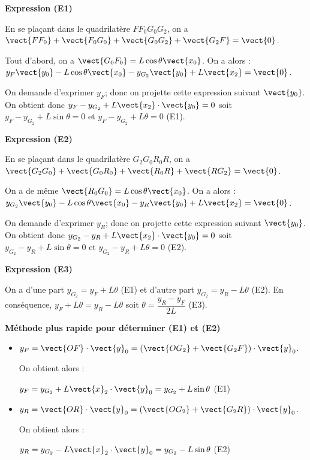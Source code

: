 \documentclass[11pt]{article}
\begin{document}
\begin{UPSTIcorrige}

\textbf{Expression (E1)}

En se plaçant dans le quadrilatère $F F_0 G_0 G_2$, on a $\vect{F F_0} + \vect{F_0 G_0}+\vect{G_0 G_2}+\vect{G_2 F}=\vect{0}$. 

Tout d'abord, on a $\vect{G_0 F_0} = L\cos \theta \vect{x_0}$. On a alors : $y_F \vect{y_0} - L\cos \theta \vect{x_0} - y_{G_2} \vect{y_0} + L\vect{x_2}=\vect{0}$.  

On demande d'exprimer $y_F$; donc on projette cette expression suivant  $\vect{y_0}$. On obtient donc 
$y_F - y_{G_2}  + L\vect{x_2}\cdot \vect{y_0}=0$ soit $y_F - y_{G_2}  + L\sin \theta=0$ et   $y_F - y_{G_2}  + L \theta=0$  (E1).

\textbf{Expression (E2)}

En se plaçant dans le quadrilatère $G_2 G_0 R_0 R$, on a $\vect{G_2 G_0} + \vect{ G_0 R_0}+\vect{R_0 R}+\vect{R G_2 }=\vect{0}$. 

On a de même $\vect{R_0 G_0} = L\cos \theta \vect{x_0}$. On a alors : $y_{G_2} \vect{y_0} - L\cos \theta \vect{x_0} - y_{R} \vect{y_0} + L\vect{x_2}=\vect{0}$.  

On demande d'exprimer $y_R$; donc on projette cette expression suivant  $\vect{y_0}$. On obtient donc 
$y_{G_2}  - y_{R}  + L\vect{x_2}\cdot \vect{y_0}=0$ soit $y_{G_2}  - y_{R}  + L\sin \theta=0$ et $y_{G_2}  - y_{R}  + L \theta=0$ (E2).


\textbf{Expression (E3)}

On a d'une part $y_{G_2} = y_F  + L \theta$  (E1) et d'autre part $y_{G_2}  = y_{R}  - L \theta$ (E2).
En conséquence,  $y_F  + L \theta =  y_{R}  - L \theta$  soit $  \theta = \dfrac{ y_{R} - y_F}{2L } $ (E3).

\textbf{Méthode plus rapide pour déterminer (E1) et (E2)}

\begin{itemize}
\item $y_F=\vect{OF}\cdot \vect{y}_0=\left(\vect{OG_2}+\vect{G_2F}\right)\cdot \vect{y}_0$.

On obtient alors : 

$y_F=y_{G_2}+L\vect{x}_2\cdot \vect{y}_0=y_{G_2}+L\sin\theta$ (E1)

\item $y_R=\vect{OR}\cdot \vect{y}_0=\left(\vect{OG_2}+\vect{G_2R}\right)\cdot \vect{y}_0$.

On obtient alors : 

$y_R=y_{G_2}-L\vect{x}_2\cdot \vect{y}_0=y_{G_2}-L\sin\theta$ (E2)
\end{itemize}



\end{UPSTIcorrige}
\end{document}
